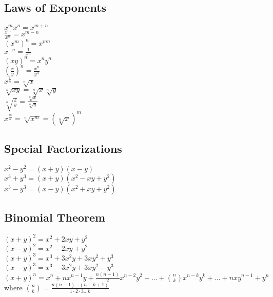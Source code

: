 \documentclass{article}
\begin{document}
	\subsection*{Laws of Exponents}
		\begin{center}
		$x^m x^n = x^{m+n}$\\
		\vspace{10pt}
		$\frac{x^m}{x^n} = x^{m-n}$\\
		\vspace{10pt}
		$(x^m)^n = x^{mn}$\\
		\vspace{10pt}
		$x^{-n} = \frac{1}{x^n}$\\
		\vspace{10pt}
		$(xy)^n = x^n y^n$\\
		\vspace{10pt}	
		$(\frac{x}{y})^n = \frac{x^n}{y^n}$\\	
		\vspace{10pt}	
		$x^{\frac{1}{n}} = \sqrt[n]{x}$\\	
		\vspace{10pt}	
		$\sqrt[n]{xy} = \sqrt[n]{x}\sqrt[n]{y}$\\
		\vspace{10pt}
		$\sqrt[n]{\frac{x}{y}} = \frac{\sqrt[n]{x}}{\sqrt[n]{y}}$\\
		\vspace{10pt}
		$x^{\frac{m}{n}} = \sqrt[n]{x^m} = (\sqrt[n]{x})^m$
		\end{center}
	\subsection*{Special Factorizations}
		\begin{center}
		$x^2 - y^2 = (x + y)(x - y)$\\
		\vspace{10pt}
		$x^3 + y^3 = (x + y)(x^2 - xy + y^2)$\\
		\vspace{10pt}
		$x^3 - y^3 = (x-y)(x^2 + xy + y^2)$
		\end{center}
	\subsection*{Binomial Theorem}
		\begin{center}
		$(x+y)^2 = x^2 + 2xy +y^2$\\
		\vspace{10pt}
		$(x-y)^2 = x^2 - 2xy + y^2$\\
		\vspace{10pt}
		$(x+y)^3 = x^3 + 3x^2y + 3xy^2 + y^3$\\
		\vspace{10pt}
		$(x-y)^3 = x^3 - 3x^2y + 3xy^2 - y^3$\\
		\vspace{10pt}
		$(x+y)^n = x^n + nx^{n-1}y + \frac{n(n-1)}{2}x^{n-2}y^2 + \ldots + \binom{n}{k}x^{n-k}y^k + \ldots + nxy^{n-1} + y^n$\\
		where $\binom{n}{k} = \frac{n(n-1)\ldots(n-k+1)}{1 \cdot 2 \cdot 3 \ldots k}$
		\end{center}
\end{document}
